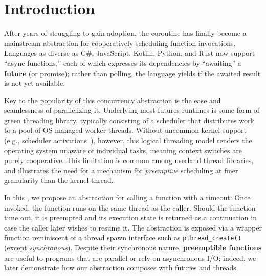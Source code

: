 \section{Introduction}
\label{sec:intro}

After years of struggling to gain adoption, the coroutine has finally become a
mainstream abstraction for cooperatively scheduling function invocations.  Languages
as diverse as C\#, JavaScript, Kotlin, Python, and Rust now support ``async
functions,'' each of which expresses its dependencies by ``awaiting'' a
\textbf{future} (or promise); rather than polling, the language yields if the awaited
result is not yet available.

Key to the popularity of this concurrency abstraction is the ease and seamlessness of
parallelizing it.  Underlying most futures runtimes is some form of green threading
library, typically consisting of a scheduler that distributes work to a pool of
OS-managed worker threads.  Without uncommon kernel
support (e.g., scheduler activations~\cite{anderson:sosp1991}), however, this logical
threading model renders the operating system unaware of individual tasks, meaning
context switches are purely cooperative.  This limitation is common among userland
thread libraries, and illustrates the need for a mechanism for \textit{preemptive}
scheduling at finer granularity than the kernel thread.

In this \paper, we propose an abstraction for calling a function with a timeout:  Once
invoked, the function runs on the same thread as the caller.  Should the function
time out, it is preempted and its execution state is returned as a continuation in
case the caller later wishes to resume it.  The abstraction is exposed via a wrapper
function reminiscent of a thread spawn interface such as \texttt{pthread\_create()}
(except \textit{synchronous}).  Despite their synchronous nature, \textbf{preemptible
functions} are useful to programs that are parallel or rely on asynchronous I/O;
indeed, we later demonstrate how our abstraction composes with futures and threads.

